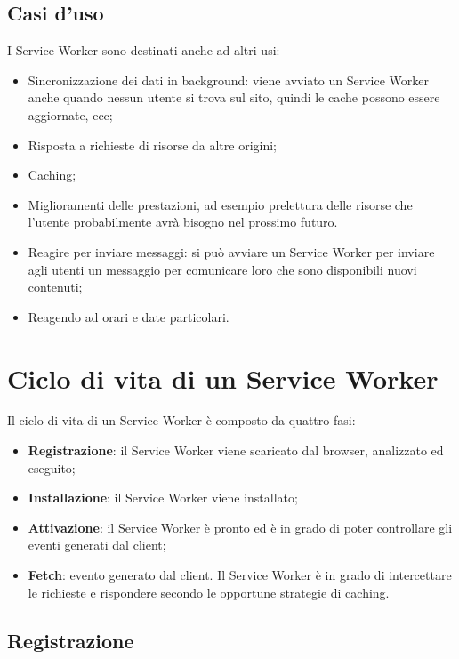 \documentclass[11pt ,a4paper , twoside , openright ]{book}
\begin{document}
	\subsection{Casi d'uso}
	I Service Worker sono destinati anche ad altri usi:
	\begin{itemize}
		\item Sincronizzazione dei dati in background: viene avviato un Service Worker anche quando nessun utente si trova sul sito, quindi le cache possono essere aggiornate, ecc;
		\item Risposta a richieste di risorse da altre origini;
		\item Caching;
		\item Miglioramenti delle prestazioni, ad esempio prelettura delle risorse che l'utente probabilmente avrà bisogno nel prossimo futuro.
		\item Reagire per inviare messaggi: si può avviare un Service Worker per inviare agli utenti un messaggio per comunicare loro che sono disponibili nuovi contenuti;
		\item Reagendo ad orari e date particolari.
	\end{itemize}
	
	\section{Ciclo di vita di un Service Worker}
	Il ciclo di vita di un Service Worker \cite{rif20} \cite{rif21} \cite{rif26} è composto da quattro fasi:
	\begin{itemize}
		\item \textbf{Registrazione}: il Service Worker viene scaricato dal browser, analizzato ed eseguito;
		\item \textbf{Installazione}: il Service Worker viene installato;
		\item \textbf{Attivazione}: il Service Worker è pronto ed è in grado di poter controllare gli eventi generati dal client;
		\item\textbf{ Fetch}: evento generato dal client. Il Service Worker è in grado di intercettare le richieste e rispondere secondo le opportune strategie di caching. 
	\end{itemize}
	
	\subsection{Registrazione}
	
\end{document}
